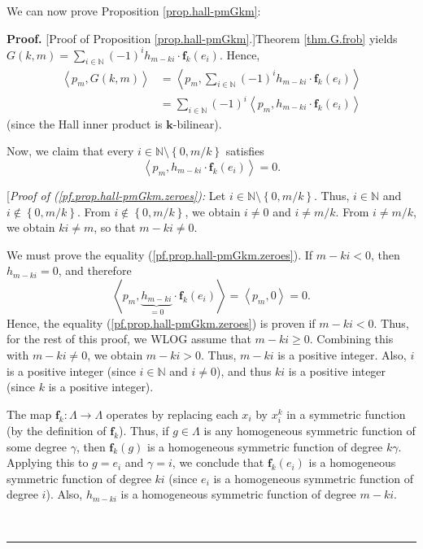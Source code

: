 \documentclass[numbers=enddot,12pt,final,onecolumn,notitlepage]{scrartcl}%
\theoremstyle{definition}
\newenvironment{proof}[1][Proof]{\noindent\textbf{#1.} }{\ \rule{0.5em}{0.5em}}
\let\sumnonlimits\sum
\renewcommand{\sum}{\sumnonlimits\limits}
\begin{document}
We can now prove Proposition \ref{prop.hall-pmGkm}:

\begin{proof}
[Proof of Proposition \ref{prop.hall-pmGkm}.]Theorem \ref{thm.G.frob} yields
$G\left(  k,m\right)  =\sum_{i\in\mathbb{N}}\left(  -1\right)  ^{i}%
h_{m-ki}\cdot\mathbf{f}_{k}\left(  e_{i}\right)  $. Hence,%
\begin{align}
\left\langle p_{m},G\left(  k,m\right)  \right\rangle  &  =\left\langle
p_{m},\sum_{i\in\mathbb{N}}\left(  -1\right)  ^{i}h_{m-ki}\cdot\mathbf{f}%
_{k}\left(  e_{i}\right)  \right\rangle \nonumber\\
&  =\sum_{i\in\mathbb{N}}\left(  -1\right)  ^{i}\left\langle p_{m}%
,h_{m-ki}\cdot\mathbf{f}_{k}\left(  e_{i}\right)  \right\rangle
\label{pf.prop.hall-pmGkm.1}%
\end{align}
(since the Hall inner product is $\mathbf{k}$-bilinear).

Now, we claim that every $i\in\mathbb{N}\setminus\left\{  0,m/k\right\}  $
satisfies%
\begin{equation}
\left\langle p_{m},h_{m-ki}\cdot\mathbf{f}_{k}\left(  e_{i}\right)
\right\rangle =0. \label{pf.prop.hall-pmGkm.zeroes}%
\end{equation}


[\textit{Proof of (\ref{pf.prop.hall-pmGkm.zeroes}):} Let $i\in\mathbb{N}%
\setminus\left\{  0,m/k\right\}  $. Thus, $i\in\mathbb{N}$ and $i\notin%
\left\{  0,m/k\right\}  $. From $i\notin\left\{  0,m/k\right\}  $, we obtain
$i\neq0$ and $i\neq m/k$. From $i\neq m/k$, we obtain $ki\neq m$, so that
$m-ki\neq0$.

We must prove the equality (\ref{pf.prop.hall-pmGkm.zeroes}). If $m-ki<0$,
then $h_{m-ki}=0$, and therefore%
\[
\left\langle p_{m},\underbrace{h_{m-ki}}_{=0}\cdot\mathbf{f}_{k}\left(
e_{i}\right)  \right\rangle =\left\langle p_{m},0\right\rangle =0.
\]
Hence, the equality (\ref{pf.prop.hall-pmGkm.zeroes}) is proven if $m-ki<0$.
Thus, for the rest of this proof, we WLOG assume that $m-ki\geq0$. Combining
this with $m-ki\neq0$, we obtain $m-ki>0$. Thus, $m-ki$ is a positive integer.
Also, $i$ is a positive integer (since $i\in\mathbb{N}$ and $i\neq0$), and
thus $ki$ is a positive integer (since $k$ is a positive integer).

The map $\mathbf{f}_{k}:\Lambda\rightarrow\Lambda$ operates by replacing each
$x_{i}$ by $x_{i}^{k}$ in a symmetric function (by the definition of
$\mathbf{f}_{k}$). Thus, if $g\in\Lambda$ is any homogeneous symmetric
function of some degree $\gamma$, then $\mathbf{f}_{k}\left(  g\right)  $ is a
homogeneous symmetric function of degree $k\gamma$. Applying this to $g=e_{i}$
and $\gamma=i$, we conclude that $\mathbf{f}_{k}\left(  e_{i}\right)  $ is a
homogeneous symmetric function of degree $ki$ (since $e_{i}$ is a homogeneous
symmetric function of degree $i$). Also, $h_{m-ki}$ is a homogeneous symmetric
function of degree $m-ki$.


\end{proof}
\end{document}
